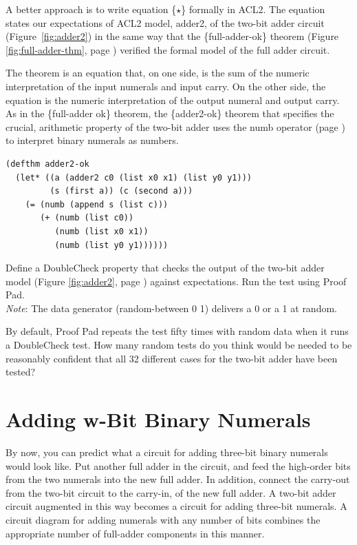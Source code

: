 A better approach is to write equation \{$\star$\}
formally in ACL2. The equation states our expectations of
ACL2 model, \textsf{adder2}, of the 
two-bit adder circuit (Figure~\ref{fig:adder2})
in the same way that the \{full-adder-ok\} theorem
(Figure \ref{fig:full-adder-thm}, page \pageref{fig:full-adder-thm})
verified the formal model of the full adder circuit.

The theorem is an equation that, on one side, is the
sum of the numeric interpretation of the input numerals
and input carry. On the other side, the equation is
the numeric interpretation of the output numeral
and output carry.
As in the \{full-adder ok\} theorem,
the \{adder2-ok\} theorem that specifies
the crucial, arithmetic property of the two-bit adder
uses the \textsf{numb} operator (page \pageref{nmb-defun})
to interpret binary numerals as numbers.

\label{adder2-ok}
\begin{Verbatim}
(defthm adder2-ok
  (let* ((a (adder2 c0 (list x0 x1) (list y0 y1)))
         (s (first a)) (c (second a)))
    (= (numb (append s (list c)))
       (+ (numb (list c0))
          (numb (list x0 x1))
          (numb (list y0 y1))))))
\end{Verbatim}

\begin{ExerciseList}
\Exercise Define a DoubleCheck property that checks the
output of the two-bit adder model
(Figure \ref{fig:adder2}, page \pageref{fig:adder2})
against expectations.
Run the test using Proof Pad.\\
\emph{Note}: The data generator (random-between 0 1) delivers
a 0 or a 1 at random.

\Exercise By default, Proof Pad repeats the test fifty times
with random data
when it runs a DoubleCheck test.
How many random tests do you think would be needed to be reasonably
confident that all 32 different cases for the two-bit adder have been tested?
\end{ExerciseList}

\section{Adding w-Bit Binary Numerals}
\label{sec:adding-w-bit-numerals}

By now, you can predict what a circuit for adding three-bit
binary numerals would look like.
Put another full adder in the circuit, and feed the
high-order bits from the two numerals into the new full adder.
In addition, connect the carry-out from the two-bit circuit
to the carry-in, of the new full adder.
A two-bit adder circuit augmented in this way
becomes a circuit for adding three-bit numerals.
A circuit diagram for adding numerals with any number of bits
combines the appropriate number of
full-adder components in this manner.

